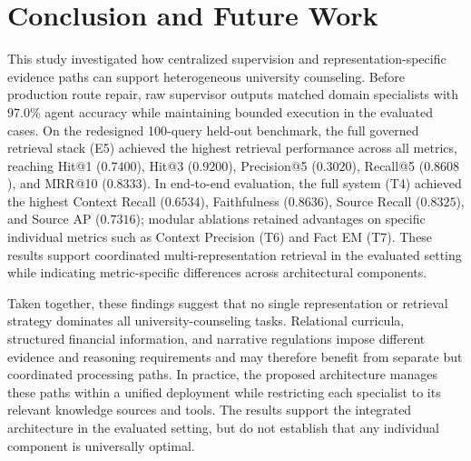 \section{Conclusion and Future Work}
\label{sec:conclusion}

This study investigated how centralized supervision and representation-specific evidence paths can support heterogeneous university counseling. Before production route repair, raw supervisor outputs matched domain specialists with 97.0\% agent accuracy while maintaining bounded execution in the evaluated cases. On the redesigned 100-query held-out benchmark, the full governed retrieval stack (E5) achieved the highest retrieval performance across all metrics, reaching Hit@1 ($0.7400$), Hit@3 ($0.9200$), Precision@5 ($0.3020$), Recall@5 ($0.8608$), and MRR@10 ($0.8333$). In end-to-end evaluation, the full system (T4) achieved the highest Context Recall ($0.6534$), Faithfulness ($0.8636$), Source Recall ($0.8325$), and Source AP ($0.7316$); modular ablations retained advantages on specific individual metrics such as Context Precision (T6) and Fact EM (T7). These results support coordinated multi-representation retrieval in the evaluated setting while indicating metric-specific differences across architectural components.

Taken together, these findings suggest that no single representation or retrieval strategy dominates all university-counseling tasks. Relational curricula, structured financial information, and narrative regulations impose different evidence and reasoning requirements and may therefore benefit from separate but coordinated processing paths. In practice, the proposed architecture manages these paths within a unified deployment while restricting each specialist to its relevant knowledge sources and tools. The results support the integrated architecture in the evaluated setting, but do not establish that any individual component is universally optimal.

